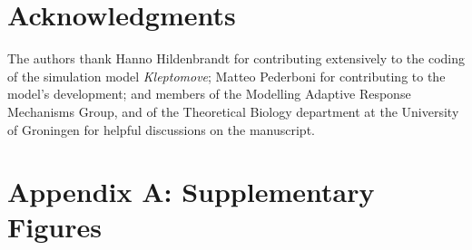 \documentclass[11pt]{article}
\begin{document}

\section{Acknowledgments}

The authors thank Hanno Hildenbrandt for contributing extensively to the coding of the simulation model \textit{Kleptomove};
Matteo Pederboni for contributing to the model's development; 
and members of the Modelling Adaptive Response Mechanisms Group, and of the Theoretical Biology department at the University of Groningen for helpful discussions on the manuscript.



\newpage{}

\section{Appendix A: Supplementary Figures}

%
%
%
%
%
\end{document}
